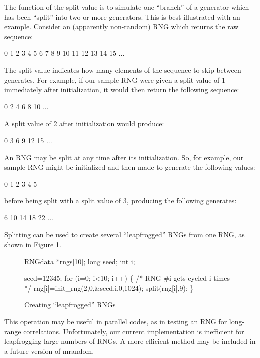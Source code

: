 The function of the split value is to simulate one ``branch'' of a
generator which has been ``split'' into two or more generators.  This is
best illustrated with an example.  Consider an (apparently non-random)
RNG which returns the raw sequence:
\begin{center}
0 1 2 3 4 5 6 7 8 9 10 11 12 13 14 15 ...\\
\end{center}
The split value indicates how many elements of the sequence to skip
between generates.  For example, if our sample RNG were given a split
value of 1 immediately after initialization, it would then return the following
sequence:
\begin{center}
0 2 4 6 8 10 ...\\
\end{center}
A split value of 2 after initialization would produce:
\begin{center}
0 3 6 9 12 15 ...\\
\end{center}
An RNG may be split at any time after its initialization.  So, for
example, our sample RNG might be initialized and then made to generate
the following values:
\begin{center}
0 1 2 3 4 5\\
\end{center}
before being split with a split value of 3, producing the following
generates:
\begin{center}
6 10 14 18 22 ...\\
\end{center}
Splitting can be used to create several ``leapfrogged'' RNGs from one
RNG, as shown in Figure \ref{fig:leapfrog}.

\begin{figure}
\begin{example}
RNGdata *rngs[10];
long seed;
int i;

seed=12345;
for (i=0; i<10; i++) \{
  /* RNG #i gets cycled i times */
  rng[i]=init_rng(2,0,&seed,i,0,1024);
  split(rng[i],9);
\}
\end{example}
\caption{Creating ``leapfrogged'' RNGs}
\label{fig:leapfrog}
\end{figure}

This operation may be useful in parallel codes, as in testing an RNG for
long-range correlations.  Unfortunately, our current implementation is
inefficient for leapfrogging large numbers of RNGs.  A more efficient
method may be included in a future version of mrandom.

